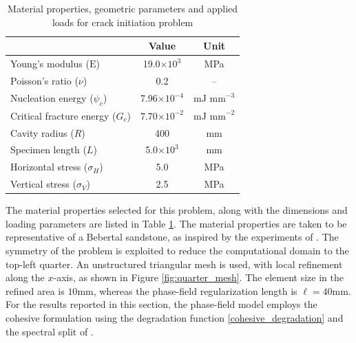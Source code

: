 \begin{table}[h]
\centering
\caption{Material properties, geometric parameters and applied loads for crack initiation problem}
\begin{tabular}[t]{lcc}
\hline
&Value &Unit \\
\hline
Young's modulus ($\text{E}$)&19.0$\times10^3$&MPa\\
Poisson's ratio ($\nu$)&0.2&--\\
Nucleation energy ($\psi_c$)&7.96$\times10^{-4}$&$\text{mJ mm}^{-3}$\\
Critical fracture energy  ($G_c$)&7.70$\times10^{-2}$&$\text{mJ mm}^{-2}$\\
Cavity radius ($R$)&400&mm\\
Specimen length ($L$)&5.0$\times10^{3}$&mm\\
Horizontal stress ($\sigma_H$)&5.0&MPa\\
Vertical stress ($\sigma_V$)&2.5&MPa\\
\hline
\end{tabular}
\label{material_properties_initiation}
\end{table}


The material properties selected for this problem, along with the dimensions and loading parameters are listed in Table \ref{material_properties_initiation}.  The material properties are taken to be representative of a Bebertal sandstone, as inspired by the experiments of \cite{stoeckhert2015fracture}.
The symmetry of the problem is exploited to reduce the computational domain to the top-left quarter.  An unstructured triangular mesh is used, with local refinement along the $x$-axis, as shown in Figure \ref{fig:quarter_mesh}. The element size in the refined area is $10$mm, whereas the phase-field regularization length is $\ell = 40$mm. For the results reported in this section, the phase-field model employs the cohesive formulation\cite{lorentz2011convergence, geelen2019phase} using the degradation function \eqref{cohesive_degradation} and the spectral split of  \cite{miehe2010phase}.  

